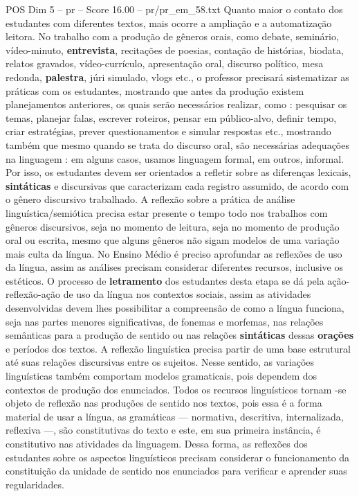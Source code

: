 \begin{textsample}{POS Dim 5 – pr – Score 16.00 – pr/pr\_em\_58.txt}
Quanto maior o contato dos estudantes com diferentes textos, mais ocorre a ampliação e a automatização leitora.
No trabalho com a produção de gêneros orais, como debate, seminário, vídeo-minuto, \textbf{entrevista}, recitações de poesias, contação de histórias, biodata, relatos gravados, vídeo-currículo, apresentação oral, discurso político, mesa redonda, \textbf{palestra}, júri simulado, vlogs etc., o professor precisará sistematizar as práticas com os estudantes, mostrando que antes da produção existem planejamentos anteriores, os quais serão necessários realizar, como : pesquisar os temas, planejar falas, escrever roteiros, pensar em público-alvo, definir tempo, criar estratégias, prever questionamentos e simular respostas etc., mostrando também que mesmo quando se trata do discurso oral, são necessárias adequações na linguagem : em alguns casos, usamos linguagem formal, em outros, informal.
Por isso, os estudantes devem ser orientados a refletir sobre as diferenças lexicais, \textbf{sintáticas} e discursivas que caracterizam cada registro assumido, de acordo com o gênero discursivo trabalhado.
A reflexão sobre a prática de análise linguística/semiótica precisa estar presente o tempo todo nos trabalhos com gêneros discursivos, seja no momento de leitura, seja no momento de produção oral ou escrita, mesmo que alguns gêneros não sigam modelos de uma variação mais culta da língua.
No Ensino Médio é preciso aprofundar as reflexões de uso da língua, assim as análises precisam considerar diferentes recursos, inclusive os estéticos.
O processo de \textbf{letramento} dos estudantes desta etapa se dá pela ação-reflexão-ação de uso da língua nos contextos sociais, assim as atividades desenvolvidas devem lhes possibilitar a compreensão de como a língua funciona, seja nas partes menores significativas, de fonemas e morfemas, nas relações semânticas para a produção de sentido ou nas relações \textbf{sintáticas} dessas \textbf{orações} e períodos dos textos.
A reflexão linguística precisa partir de uma base estrutural até suas relações discursivas entre os sujeitos.
Nesse sentido, as variações linguísticas também comportam modelos gramaticais, pois dependem dos contextos de produção dos enunciados.
Todos os recursos linguísticos tornam -se objeto de reflexão nas produções de sentido nos textos, pois essa é a forma material de usar a língua, as gramáticas — normativa, descritiva, internalizada, reflexiva —, são constitutivas do texto e este, em sua primeira instância, é constitutivo nas atividades da linguagem.
Dessa forma, as reflexões dos estudantes sobre os aspectos linguísticos precisam considerar o funcionamento da constituição da unidade de sentido nos enunciados para verificar e aprender suas regularidades.

\end{textsample}

